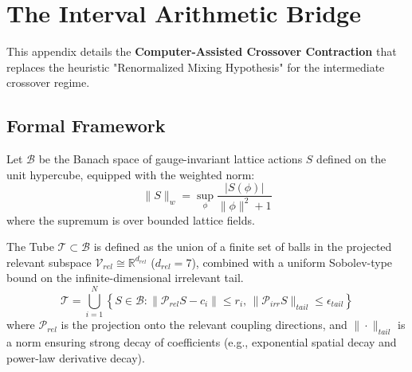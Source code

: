 \chapter{The Interval Arithmetic Bridge}
\label{app:appendix_K_interval_bridge}

This appendix details the \textbf{Computer-Assisted Crossover Contraction} that replaces the heuristic "Renormalized Mixing Hypothesis" for the intermediate crossover regime.

\section{Formal Framework}

\begin{definition}
Let $\mathcal{B}$ be the Banach space of gauge-invariant lattice actions $S$ defined on the unit hypercube, equipped with the weighted norm:
\begin{equation}
    \|S\|_w = \sup_{\phi} \frac{|S(\phi)|}{\|\phi\|^2 + 1}
\end{equation}
where the supremum is over bounded lattice fields.
\end{definition}

\begin{definition}
\label{def:tube_strict}
The Tube $\mathcal{T} \subset \mathcal{B}$ is defined as the union of a finite set of balls in the projected relevant subspace $\mathcal{V}_{rel} \cong \mathbb{R}^{d_{rel}}$ ($d_{rel}=7$), combined with a uniform Sobolev-type bound on the infinite-dimensional irrelevant tail.
\[
\mathcal{T} = \bigcup_{i=1}^N \left\{ S \in \mathcal{B} : \|\mathcal{P}_{rel} S - c_i\| \le r_i, \, \|\mathcal{P}_{irr} S\|_{tail} \le \epsilon_{tail} \right\}
\]
where $\mathcal{P}_{rel}$ is the projection onto the relevant coupling directions, and $\|\cdot\|_{tail}$ is a norm ensuring strong decay of coefficients (e.g., exponential spatial decay and power-law derivative decay).
\end{definition}

